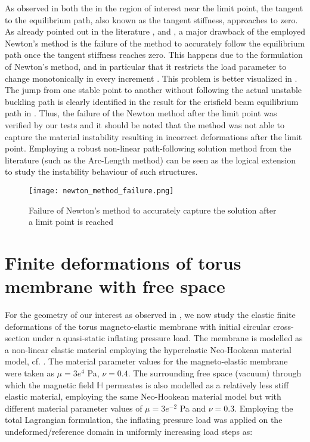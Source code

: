 As observed in both the  in the region of interest near the limit point, the tangent to the equilibrium path, also known as the tangent stiffness, approaches to zero. As already pointed out in the literature \cite{Riks1979}, \cite{CRISFIELD1981} and \cite{Vasios}, a major drawback of the employed Newton's method is the failure of the method to accurately follow the equilibrium path once the tangent stiffness reaches zero. This happens due to the formulation of Newton's method, and in particular that it restricts the load parameter to change monotonically in every increment \cite{Vasios}. This problem is better visualized in . The jump from one stable point to another without following the actual unstable buckling path is clearly identified in the result for the crisfield beam equilibrium path in . Thus, the failure of the Newton method after the limit point was verified by our tests and it should be noted that the method was not able to capture the material instability resulting in incorrect deformations after the limit point. Employing a robust non-linear path-following solution method from the literature \cite{CRISFIELD1981} (such as the Arc-Length method) can be seen as the logical extension to study the instability behaviour of such structures. \par 

\begin{figure}[h]
\centering
\texttt{[image: newton\_method\_failure.png]}
\caption{Failure of Newton's method to accurately capture the solution after a limit point is reached \cite{Vasios}}
\label{fig:2.17}
\end{figure}

\section{Finite deformations of torus membrane with free space}
For the geometry of our interest as observed in , we now study the elastic finite deformations of the torus magneto-elastic membrane with initial circular cross-section under a quasi-static inflating pressure load. The membrane is modelled as a non-linear elastic material employing the hyperelastic Neo-Hookean material model, cf. . The material parameter values for the magneto-elastic membrane were taken as $\mu = 3e^4$ Pa, $\nu = 0.4$. The surrounding free space (vacuum) through which the magnetic field $\mathbb{H}$ permeates is also modelled as a relatively less stiff elastic material, employing the same Neo-Hookean material model but with different material parameter values of $\mu = 3e^{-2}$ Pa and $\nu = 0.3$. Employing the total Lagrangian formulation, the inflating pressure load was applied on the undeformed/reference domain in uniformly increasing load steps as:

